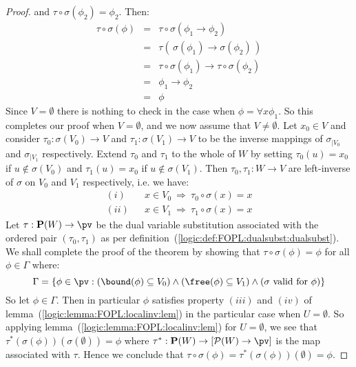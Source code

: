 \begin{proof}
and $\tau\circ\sigma(\phi_{2})=\phi_{2}$. Then:
    \begin{eqnarray*}
    \tau\circ\sigma(\phi)&=&\tau\circ\sigma(\phi_{1}\to\phi_{2})\\
    &=&\tau(\,\sigma(\phi_{1})\to\sigma(\phi_{2})\,)\\
    &=&\tau\circ\sigma(\phi_{1})\to\tau\circ\sigma(\phi_{2})\\
    &=&\phi_{1}\to\phi_{2}\\
    &=&\phi
    \end{eqnarray*}
Since $V=\emptyset$ there is nothing to check in the case when
$\phi=\forall x\phi_{1}$. So this completes our proof when
$V=\emptyset$, and we now assume that $V\neq\emptyset$. Let
$x_{0}\in V$ and consider $\tau_{0}:\sigma(V_{0})\to V$ and
$\tau_{1}:\sigma(V_{1})\to V$ to be the inverse mappings of
$\sigma_{|V_{0}}$ and $\sigma_{|V_{1}}$ respectively. Extend
$\tau_{0}$ and $\tau_{1}$ to the whole of $W$ by setting
$\tau_{0}(u)=x_{0}$ if $u\not\in\sigma(V_{0})$ and
$\tau_{1}(u)=x_{0}$ if $u\not\in\sigma(V_{1})$. Then $\tau_{0},
\tau_{1}:W\to V$ are left-inverse of $\sigma$ on $V_{0}$ and $V_{1}$
respectively, i.e. we have:
    \begin{eqnarray*}
    (i)&&x\in V_{0}\ \Rightarrow\ \tau_{0}\circ\sigma(x)=x\\
    (ii)&&x\in V_{1}\ \Rightarrow\ \tau_{1}\circ\sigma(x)=x
    \end{eqnarray*}
Let $\tau:{\bf P}(W)\to\pv$ be the dual variable substitution
associated with the ordered pair $(\tau_{0},\tau_{1})$ as per
definition~(\ref{logic:def:FOPL:dualsubst:dualsubst}). We shall
complete the proof of the theorem by showing that
$\tau\circ\sigma(\phi)=\phi$ for all $\phi\in\Gamma$ where:
    \[
        \Gamma = 
            \{ \phi\in\pv:
                (\bound(\phi)\subseteq V_{0})\land
                (\free(\phi)\subseteq V_{1}) \land
                (\mbox{$\sigma$ valid for $\phi$})
            \}
    \]
So let $\phi\in\Gamma$. Then in particular $\phi$ satisfies property
$(iii)$ and $(iv)$ of lemma~(\ref{logic:lemma:FOPL:localinv:lem}) in
the particular case when $U=\emptyset$. So applying
lemma~(\ref{logic:lemma:FOPL:localinv:lem}) for $U=\emptyset$, we
see that $\tau^{*}(\sigma(\phi))(\sigma(\emptyset))=\phi$
where $\tau^{*}:{\bf P}(W)\to[{\cal P}(W)\to\pv]$ is the map
associated with $\tau$. Hence we conclude that
$\tau\circ\sigma(\phi)=\tau^{*}(\sigma(\phi))(\emptyset)=\phi$.
\end{proof}
